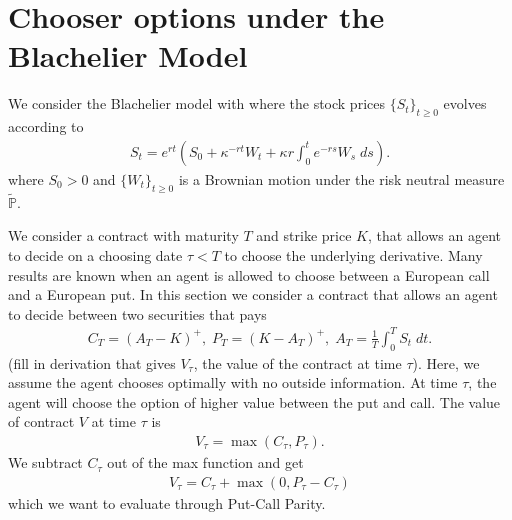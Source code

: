 \documentclass[reqno]{amsart}
\begin{document}
%
\begin{nouppercase}
\maketitle
\end{nouppercase}




\tableofcontents
\setcounter{part}{0}


\section{Chooser options under the Blachelier Model}
We consider the Blachelier model with where the stock prices $\{S_t\}_{t \ge 0}$ evolves according to 
\begin{align}
	 S_t = e^{rt} \left( S_0 + \kappa^{-rt}W_t + \kappa r \int_0^t e^{-rs} W_s \; ds \right).
\end{align}
where $S_0 > 0$ and $\{W_t\}_{t \ge 0}$ is a Brownian motion under the risk neutral measure $\tilde{\mathbb{P}}$.

We consider a contract with maturity $T$ and strike price $K$, that allows an agent to decide on a choosing date $\tau < T$ to choose the underlying derivative. Many results are known when an agent is allowed to choose between a European call and a European put. In this section we consider a contract that allows an agent to decide between two securities that pays 
\begin{align}
     C_T = (A_T - K)^+, \; P_T = (K - A_T)^+, \; A_T = \frac{1}{T} \int_0^T S_t \; dt.
\end{align}
(fill in derivation that gives $V_\tau$, the value of the contract at time $\tau$).
Here, we assume the agent chooses optimally with no outside information. At time $\tau$, the agent will choose the option of higher value between the put and call. The value of contract $V$ at time $\tau$ is 
\begin{align}
     V_\tau = \max(C_\tau, P_\tau).
\end{align}
We subtract $C_\tau$ out of the max function and get
\begin{align}
     V_\tau = C_\tau + \max(0, P_\tau - C_\tau)
\end{align}
which we want to evaluate through Put-Call Parity.
\end{document}
